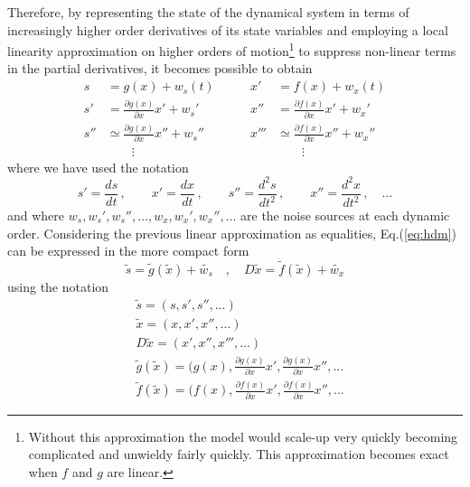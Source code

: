 \documentclass[10pt]{article}
\begin{document}
Therefore, by representing the state of the dynamical system in terms of increasingly higher order derivatives of its state variables and employing a local linearity approximation on higher orders of motion\footnote{Without this approximation the model would scale-up very quickly becoming complicated and unwieldy fairly quickly. This approximation becomes exact when $f$ and $g$ are linear.} to suppress non-linear terms in the partial derivatives, it becomes possible to obtain
\begin{equation}
  \begin{split}
    s &= g(x) + w_{s}(t) \\
    s' &= \frac{\partial g(x)}{\partial x}x' + w_{s}' \\
    s'' & \simeq \frac{\partial g(x)}{\partial x}x'' + w_{s}''\\
    				& \qquad \vdots
  \end{split}
  \qquad
  \begin{split}
    x' &= f(x) + w_{x}(t) \\
    x'' &= \frac{\partial f(x)}{\partial x}x' + w_{x}' \\
    x''' & \simeq \frac{\partial f(x)}{\partial x}x'' + w_{x}''\\
    				& \qquad \vdots
  \end{split}
\label{eq:hdm}
\end{equation}
where we have used the notation
\begin{equation}
s' = \frac{ds}{dt} \, , \qquad x'=\frac{dx}{dt} \, , \qquad s''= \frac{d^2 s}{dt^2} \, , \qquad x''= \frac{d^2 x}{dt^2} \, , \quad \dots
\end{equation}
and where $w_{s},w_{s}',w_{s}'',\dots, w_{x},w_{x}',w_{x}'',\dots$ are the noise sources at each dynamic order.
Considering the previous linear approximation as equalities, Eq.(\ref{eq:hdm}) can be expressed in the more compact form
\begin{equation}
\tilde{s} = \tilde{g}(\tilde{x}) + \tilde{w_{s}} \quad , \quad D \tilde{x} = \tilde{f}(\tilde{x}) + \tilde{w_{x}}
\end{equation}
using the notation 
\begin{equation}
\begin{split}
    &\tilde{s} = (s, s', s'', \dots) \\
    &\tilde{x} = (x, x ', x '', \dots) \\
    &D \tilde{x} = (x',x'',x''',\dots) \\
    &\tilde{g}(\tilde{x}) = (g(x), \frac{\partial g(x)}{\partial x}x',  \frac{\partial g(x)}{\partial x}x'', \dots \\
    &\tilde{f}(\tilde{x}) = (f(x), \frac{\partial f(x)}{\partial x}x',  \frac{\partial f(x)}{\partial x}x'', \dots 
\end{split}
\end{equation}
\end{document}
